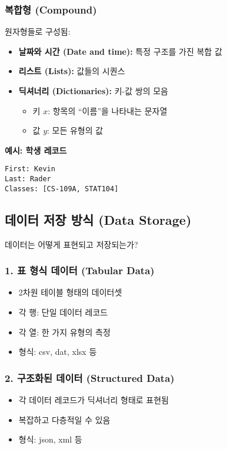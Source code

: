 \documentclass[12pt,a4paper]{article}
\begin{document}
\subsubsection{복합형 (Compound)}
원자형들로 구성됨:

\begin{itemize}
    \item \textbf{날짜와 시간 (Date and time):} 특정 구조를 가진 복합 값
    \item \textbf{리스트 (Lists):} 값들의 시퀀스
    \item \textbf{딕셔너리 (Dictionaries):} 키-값 쌍의 모음
    \begin{itemize}
        \item 키 $x$: 항목의 ``이름''을 나타내는 문자열
        \item 값 $y$: 모든 유형의 값
    \end{itemize}
\end{itemize}

\textbf{예시: 학생 레코드}
\begin{verbatim}
First: Kevin
Last: Rader
Classes: [CS-109A, STAT104]
\end{verbatim}

\subsection{데이터 저장 방식 (Data Storage)}

데이터는 어떻게 표현되고 저장되는가?

\subsubsection{1. 표 형식 데이터 (Tabular Data)}
\begin{itemize}
    \item 2차원 테이블 형태의 데이터셋
    \item 각 행: 단일 데이터 레코드
    \item 각 열: 한 가지 유형의 측정
    \item 형식: csv, dat, xlsx 등
\end{itemize}

\subsubsection{2. 구조화된 데이터 (Structured Data)}
\begin{itemize}
    \item 각 데이터 레코드가 딕셔너리 형태로 표현됨
    \item 복잡하고 다층적일 수 있음
    \item 형식: json, xml 등
\end{itemize}
\end{document}
